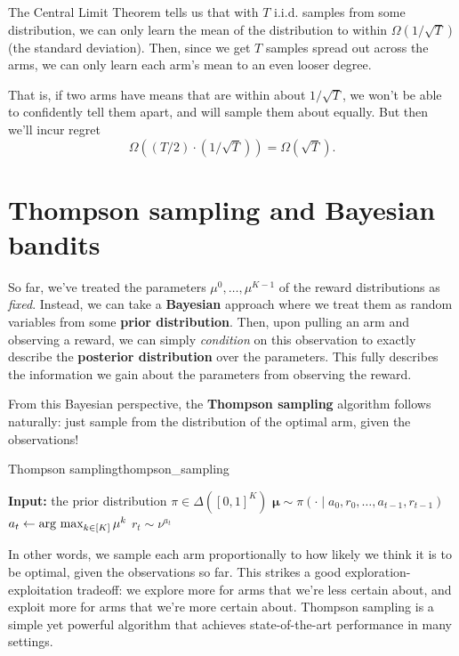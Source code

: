 \documentclass[\main/main]{subfiles}
\newcommand{\muv}{\boldsymbol{\mu}}
\begin{document}
The Central Limit Theorem tells us that with $T$ i.i.d. samples from some distribution, we can only learn the mean of the distribution to within $\Omega(1/\sqrt{T})$ (the standard deviation). Then, since we get $T$ samples spread out across the arms, we can only learn each arm's mean to an even looser degree.

That is, if two arms have means that are within about $1/\sqrt{T}$, we won't be able to confidently tell them apart, and will sample them about equally. But then we'll incur regret \[ \Omega((T/2) \cdot (1/\sqrt{T})) = \Omega(\sqrt{T}). \]


\section{Thompson sampling and Bayesian bandits}

So far, we've treated the parameters $\mu^0, \dots, \mu^{K-1}$ of the reward distributions as \emph{fixed}. Instead, we can take a \textbf{Bayesian} approach where we treat them as random variables from some \textbf{prior distribution}. Then, upon pulling an arm and observing a reward, we can simply \emph{condition} on this observation to exactly describe the \textbf{posterior distribution} over the parameters. This fully describes the information we gain about the parameters from observing the reward.

From this Bayesian perspective, the \textbf{Thompson sampling} algorithm follows naturally: just sample from the distribution of the optimal arm, given the observations!
\begin{definition}{Thompson sampling}{thompson_sampling}
    \begin{algorithmic}
        \State \textbf{Input:} the prior distribution $\pi \in \Delta([0, 1]^K)$
        \State $\muv \sim \pi(\cdot \mid a_0, r_0, \dots, a_{t-1}, r_{t-1})$
        \State $a_t \gets \operatorname*{\textrm{arg\ max}}_{k \in [K]} \mu^k$
        \State $r_t \sim \nu^{a_t}$
        \EndFor
    \end{algorithmic}
\end{definition}
In other words, we sample each arm proportionally to how likely we think it is to be optimal, given the observations so far.
This strikes a good exploration-exploitation tradeoff: we explore more for arms that we're less certain about, and exploit more for arms that we're more certain about.
Thompson sampling is a simple yet powerful algorithm that achieves state-of-the-art performance in many settings.
\end{document}
